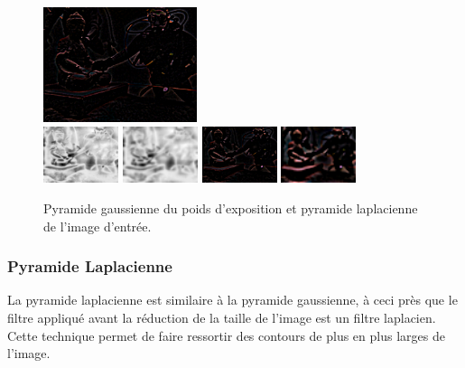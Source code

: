 \documentclass[twoside]{article}
\begin{document}
\begin{figure}
  \includegraphics[width=0.4\textwidth]{Support/laplacian2.png}\\
  \vspace{0.1cm}
  \includegraphics[width=0.196\textwidth]{Support/gaussian3.png}
  \includegraphics[width=0.196\textwidth]{Support/gaussian4.png}
  \vspace{0.1cm}
  \includegraphics[width=0.196\textwidth]{Support/laplacian3.png}
  \includegraphics[width=0.196\textwidth]{Support/laplacian4.png}

  \caption{Pyramide gaussienne du poids d'exposition et pyramide laplacienne de l'image d'entrée.}
\end{figure}


\subsubsection{Pyramide Laplacienne}
La pyramide laplacienne est similaire à la pyramide gaussienne, à ceci près que le filtre appliqué avant la réduction de la taille de l'image est un filtre laplacien. Cette technique permet de faire ressortir des contours de plus en plus larges de l'image.
\end{document}
